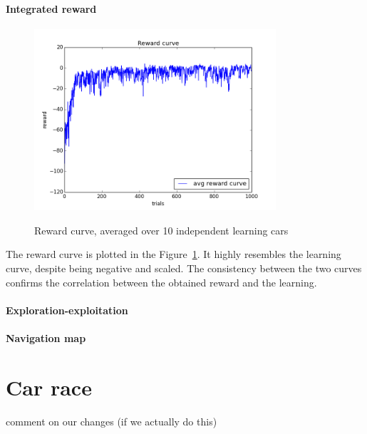 \paragraph{Integrated reward}

\begin{figure}[h!]
\centering
\includegraphics[width=0.8\textwidth]{figures/reward_curve.png}
\label{fig:rcurve}
\caption{Reward curve, averaged over 10 independent learning cars}
\end{figure}

The reward curve is plotted in the Figure~\ref{fig:rcurve}. It highly resembles
the learning curve, despite being negative and scaled. The consistency between
the two curves confirms the correlation between the obtained reward and the
learning.

\paragraph{Exploration-exploitation}

\paragraph{Navigation map}


\section{Car race}
comment on our changes (if we actually do this)
